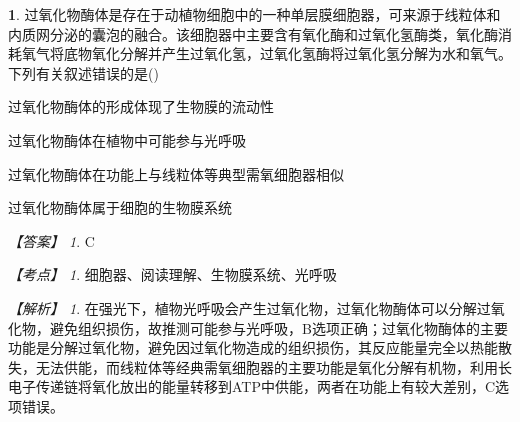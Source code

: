 \documentclass[UTF8, 10pt, a4paper, oneside]{ctexart}
\theoremstyle{definition}
\newtheorem{exercise}{}
\theoremstyle{remark}
\newtheorem*{answer}{【答案】}
\newtheorem*{point}{【考点】}      %
\newtheorem*{explanation}{【解析】}     %
\theoremstyle{plain}
\begin{document}
\begin{exercise}
    过氧化物酶体是存在于动植物细胞中的一种单层膜细胞器，可来源于线粒体和内质网分泌的囊泡的融合。该细胞器中主要含有氧化酶和过氧化氢酶类，氧化酶消耗氧气将底物氧化分解并产生过氧化氢，过氧化氢酶将过氧化氢分解为水和氧气。下列有关叙述错误的是\quad(\quad)
    \begin{adjustwidth}{2em}{}
        \begin{asparaenum}[A. ]
            \item 过氧化物酶体的形成体现了生物膜的流动性
            \item 过氧化物酶体在植物中可能参与光呼吸
            \item 过氧化物酶体在功能上与线粒体等典型需氧细胞器相似
            \item 过氧化物酶体属于细胞的生物膜系统
        \end{asparaenum}
    \end{adjustwidth}
    \begin{answer}
        C
    \end{answer}
    \begin{point}
        细胞器、阅读理解、生物膜系统、光呼吸
    \end{point}
    \begin{explanation}
        在强光下，植物光呼吸会产生过氧化物，过氧化物酶体可以分解过氧化物，避免组织损伤，故推测可能参与光呼吸，B选项正确；过氧化物酶体的主要功能是分解过氧化物，避免因过氧化物造成的组织损伤，其反应能量完全以热能散失，无法供能，而线粒体等经典需氧细胞器的主要功能是氧化分解有机物，利用长电子传递链将氧化放出的能量转移到ATP中供能，两者在功能上有较大差别，C选项错误。
    \end{explanation}
\end{exercise}
\end{document}
